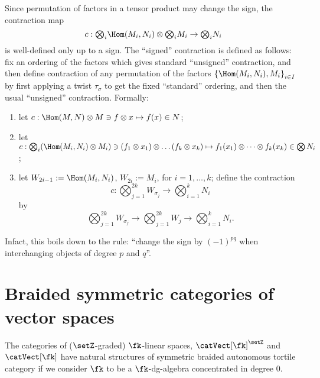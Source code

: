 Since permutation of factors in a tensor product may change the sign,
the contraction map 
\begin{equation*}
c: {\textstyle \bigotimes_i} \Hom(M_i, N_i) \otimes
 {\textstyle \bigotimes_i} M_i \to  {\textstyle \bigotimes_i} N_i
\end{equation*}
is well-defined only up to a sign. The ``signed'' contraction is
defined as follows: fix an ordering of the factors which gives
standard ``unsigned'' contraction, and then define contraction of any
permutation of the factors $\left\{\Hom(M_i,N_i), M_i\right\}_{i\in I}$ by
first applying a twist $\tau_\sigma$ to get the fixed ``standard'' ordering,
and then the usual ``unsigned'' contraction. Formally:
\begin{enumerate}
\item let $c: \Hom(M,N) \otimes M \ni f\otimes x \mapsto f(x) \in N$;
\item let $c: \bigotimes_i (\Hom(M_i, N_i) \otimes M_i) \ni (f_1\otimes x_1)
  \otimes \dots (f_k\otimes x_k) \mapsto f_1(x_1) \otimes \dots
  \otimes f_k(x_k) \in \bigotimes N_i$;
\item let $W_{2i-1} := \Hom(M_i, N_i)$, $W_{2i} := M_i$, for $i =
  1, \dots, k$; define the contraction
  \begin{equation*}
    c: {\textstyle \bigotimes_{j=1}^{2k}} W_{\sigma_j} \to
    {\textstyle \bigotimes_{i=1}^k} N_i
  \end{equation*}
  by 
  \begin{equation*}
    {\textstyle \bigotimes_{j=1}^{2k}} W_{\sigma_j} \to {\textstyle \bigotimes_{j=1}^{2k}} W_j \to
    {\textstyle \bigotimes_{i=1}^{k}} N_i.
  \end{equation*}
\end{enumerate}

Infact, this boils down to the rule: ``change the sign by
$(-1)^{pq}$ when interchanging objects of degree $p$ and $q$''.


\section{Braided symmetric categories of vector spaces}
\label{sec:btc-vect}

The categories of ($\setZ$-graded) $\fk$-linear spaces, $\catVect[\fk]^\setZ$
and $\catVect[\fk]$ have natural structures of symmetric braided
autonomous tortile category if we consider $\fk$ to be a
$\fk$-dg-algebra concentrated in degree $0$.

